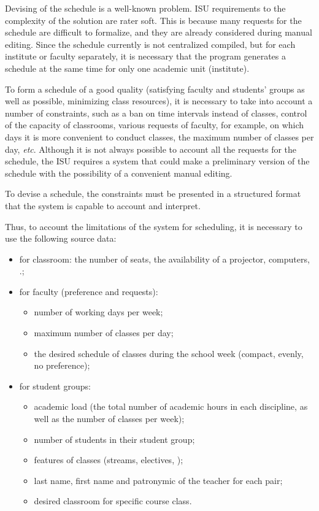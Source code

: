 \documentclass[
]{ceurart}
\begin{document}
Devising of the schedule is a well-known problem.  ISU requirements to the complexity of the solution are rater soft. This is because many requests for the schedule are difficult to formalize, and they are already considered during manual editing.  Since the schedule currently is not centralized compiled, but for each institute or faculty separately, it is necessary that the program generates a schedule at the same time for only one academic unit (institute).

To form a schedule of a good quality (satisfying faculty and students' groups as well as possible, minimizing class resources), it is necessary to take into account a number of constraints, such as a ban on time intervals instead of classes, control of the capacity of classrooms, various requests of faculty, for example, on which days it is more convenient to conduct classes, the maximum number of classes per day, \emph{etc}.  Although it is not always possible to account all the requests for the schedule, the ISU requires a system that could make a preliminary version of the schedule with the possibility of a convenient manual editing.

To devise a schedule, the constraints must be presented in a structured format that the system is capable to account and interpret.

Thus, to account the limitations of the system for scheduling, it is necessary to use the following source data:
\begin{itemize}
    \item for classroom: the number of seats, the availability of a projector, computers, .;
    \item for faculty (preference and requests):
    \begin{itemize}
        \item number of working days per week;
        \item maximum number of classes per day;
        \item the desired schedule of classes during the school week (compact, evenly, no preference);
    \end{itemize}
    \item for student groups:
    \begin{itemize}
        \item academic load (the total number of academic hours in each discipline, as well as the number of classes per week);
        \item number of students in their student group;
        \item features of classes (streams, electives, );
        \item last name, first name and patronymic of the teacher for each pair;
        \item desired classroom for specific course class.
    \end{itemize}
\end{itemize}
\end{document}
